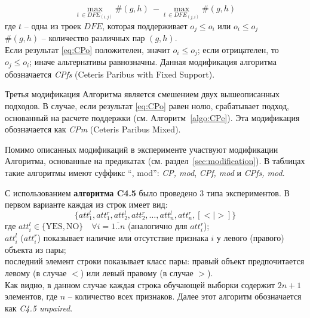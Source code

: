 	\begin{equation}
	\label{eq:CPo}
		\max_{t\, \in DFE_{(i,j)}}\#(g,h) \: - \max_{t\, \in DFE_{(j,i)}}\#(g,h)
	\end{equation}
	где $t$ – одна из троек $DFE$, которая поддерживает $o_j \leq o_i$ или $o_i \leq o_j$\\
	$\#(g,h)$ – количество различных пар $(g,h)$.\\
	Если результат \ref{eq:CPo} положителен, значит $o_i \leq o_j$; если отрицателен, то $o_j \leq o_i$; иначе альтернативы равнозначны. Данная модификация алгоритма обозначается \emph{CPfs} (Ceteris Paribus with Fixed Support).
	
	Третья модификация Алгоритма является смешением двух вышеописанных подходов. В случае, если результат \ref{eq:CPo} равен нолю, срабатывает подход, основанный на расчете поддержки (см. Алгоритм~\ref{algo:CPe}). Эта модификация обозначается как \emph{CPm} (Ceteris Paribus Mixed).
	
	Помимо описанных модификаций в эксперименте участвуют модификации Алгоритма, основанные на предикатах (см. раздел~\ref{sec:modification}). В таблицах такие алгоритмы имеют суффикс ``, mod'': \emph{CP, mod}, \emph{CPf, mod} и \emph{CPfs, mod}.
	
	С использованием \textbf{алгоритма C4.5} было проведено 3 типа экспериментов. В первом варианте каждая из строк имеет вид: 
	\begin{equation}
	\label{eq:c4.5_unpaired_row}
	\{att_1^l, att_1^r, att_2^l, att_2^r, \dots, att_n^l, att_n^r, [< | >]\}
	\end{equation}
	где $att_i^l \in \{\text{YES}, \text{NO}\} \quad \forall i = \overline{1..n}$ (аналогично для $att_i^r$); \\
	$att_i^l$ ($att_i^r$) показывает наличие или отсутствие признака $i$ у левого (правого) объекта из пары; \\
	последний элемент строки показывает класс пары: правый объект предпочитается левому (в случае $<$) или левый правому (в случае $>$). \\
	Как видно, в данном случае каждая строка обучающей выборки содержит $2n + 1$ элементов, где $n$ – количество всех признаков. Далее этот алгоритм обозначается как \emph{C4.5 unpaired}.
	
